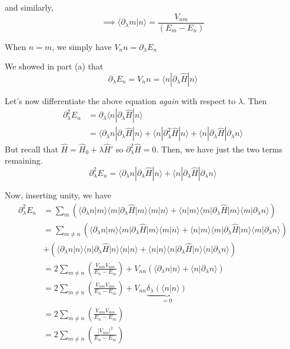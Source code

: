 \documentclass{article}
\newcommand{\inner}[2]{\langle #1 | #2 \rangle}
\begin{document}
\begin{enumerate}[label=(\alph*)]
  and similarly, 
  \[ \implies \boxed{\inner{\partial_{\lambda} m}{n} = \frac{V_{nm}}{(E_m - E_n)}} \]

  When $n = m$, we simply have $V_nn = \partial_{\lambda} E_n$

  We showed in part (a) that 
  \[ \partial_{\lambda} E_{n} = V_nn = \inner{n}{\partial_{\lambda} \hat{H}|n} \]

  Let's now differentiate the above equation \emph{again} with respect to $\lambda$. Then 
  \begin{align*}
    \partial^2_{\lambda} E_n &= \partial_{\lambda}\inner{n}{\partial_{\lambda} \hat{H}|n} \\
    &= \inner{\partial_{\lambda} n}{\partial_{\lambda} \hat{H}|n} + \inner{n}{\partial^2_{\lambda} \hat{H}|n} + \inner{n}{\partial_{\lambda} \hat{H}| \partial_{\lambda}n }
  \end{align*}
  But recall that $\hat{H} = \hat{H}_0 + \lambda \hat{H}'$ so $\partial^2_{\lambda} \hat{H} = 0$. Then, we have just the two terms remaining.
  \[ \partial^2_{\lambda} E_n  = \inner{\partial_{\lambda} n}{\partial_{\lambda} \hat{H}|n} + \inner{n}{\partial_{\lambda} \hat{H}| \partial_{\lambda}n } \]

  Now, inserting unity, we have 
  \begin{align*}
    \partial^2_{\lambda} E_n  &= \sum_{m} \left(\inner{\partial_{\lambda} n}{m} \inner{m}{\partial_{\lambda} \hat{H} | m} \inner{m}{n} + \inner{n}{m}\inner{m | \partial_{\lambda} \hat{H}}{m} \inner{m}{\partial_{\lambda} n}\right) \\
    &= \sum_{m \neq n} \left(\inner{\partial_{\lambda} n}{m} \inner{m}{\partial_{\lambda} \hat{H} | m} \inner{m}{n} + \inner{n}{m}\inner{m | \partial_{\lambda} \hat{H}}{m} \inner{m}{\partial_{\lambda} n}\right) \\
    &+ \left(\inner{\partial_{\lambda} n}{n} \inner{n}{\partial_{\lambda} \hat{H} | n} \inner{n}{n} + \inner{n}{n}\inner{n | \partial_{\lambda} \hat{H}}{n} \inner{n}{\partial_{\lambda} n}\right) \\
    &= 2 \sum_{m \neq n} \left( \frac{V_{nm}V_{mn}}{E_n - E_m} \right) + V_{nn}\left( \inner{\partial_{\lambda} n}{n} + \inner{n}{\partial_{\lambda} n} \right) \\
    &= 2 \sum_{m \neq n} \left( \frac{V_{nm}V_{mn}}{E_n - E_m} \right)  + V_{nn} \underbrace{\delta_{\lambda} \left( \inner{n}{n} \right)}_{ = 0} \\
    &= 2 \sum_{m \neq n} \left( \frac{V_{nm}V_{mn}}{E_n - E_m} \right) \\  
    &= 2 \sum_{m \neq n} \left( \frac{\left|V_{mn}\right|^2}{E_n - E_m} \right) \\  
  \end{align*}


\end{enumerate}
\end{document}
